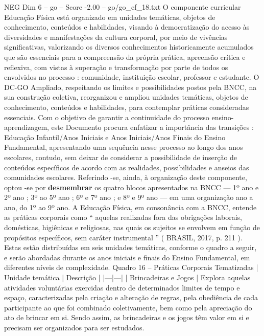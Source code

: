 \begin{textsample}{NEG Dim 6 – go – Score -2.00 – go/go\_ef\_18.txt}  \label{ex:f6_neg_171}
O componente curricular Educação Física está organizado em unidades temáticas, objetos de conhecimento, conteúdos e habilidades, visando à democratização do acesso às diversidades e manifestações da cultura corporal, por meio de vivências significativas, valorizando os diversos conhecimentos historicamente acumulados que são essenciais para a compreensão da própria prática, apreensão crítica e reflexiva, com vistas à superação e transformação por parte de todos os envolvidos no processo : comunidade, instituição escolar, professor e estudante.
O DC-GO Ampliado, respeitando os limites e possibilidades postos pela BNCC, na sua construção coletiva, reorganizou e ampliou unidades temáticas, objetos de conhecimento, conteúdos e habilidades, para contemplar práticas consideradas essenciais.
Com o objetivo de garantir a continuidade do processo ensino-aprendizagem, este Documento procura enfatizar a importância das transições : Educação Infantil/Anos Iniciais e Anos Iniciais/Anos Finais do Ensino Fundamental, apresentando uma sequência nesse processo ao longo dos anos escolares, contudo, sem deixar de considerar a possibilidade de inserção de conteúdos específicos de acordo com as realidades, possibilidades e anseios das comunidades escolares.
Referindo -se, ainda, à organização deste componente, optou -se por \textbf{desmembrar} os quatro blocos apresentados na BNCC — 1º ano e 2º ano ; 3º ao 5º ano ; 6º e 7º ano ; e 8º e 9º ano — em uma organização ano a ano, do 1º ao 9º ano.
A Educação Física, em consonância com a BNCC, entende as práticas corporais como “ aquelas realizadas fora das obrigações laborais, domésticas, higiênicas e religiosas, nas quais os sujeitos se envolvem em função de propósitos específicos, sem caráter instrumental ” ( BRASIL, 2017, p. 211 ).
Estas estão distribuídas em seis unidades temáticas, conforme o quadro a seguir, e serão abordadas durante os anos iniciais e finais do Ensino Fundamental, em diferentes níveis de complexidade.
Quadro 16 – Práticas Corporais Tematizadas | Unidade temática | Descrição | |---|---| | Brincadeiras e Jogos | Explora aquelas atividades voluntárias exercidas dentro de determinados limites de tempo e espaço, caracterizadas pela criação e alteração de regras, pela obediência de cada participante ao que foi combinado coletivamente, bem como pela apreciação do ato de brincar em si.
Sendo assim, as brincadeiras e os jogos têm valor em si e precisam ser organizados para ser estudados.

\end{textsample}
